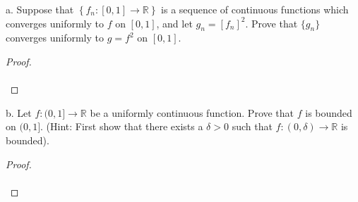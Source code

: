 a.  Suppose that $\left\{f_n:[0,1] \to \mathbb{R}\right\}$ is a sequence of
    continuous functions which converges uniformly to $f$ on $[0, 1]$, and let
    $g_n = [f_n]^2$. Prove that $\{g_n\}$ converges uniformly to 
    $g = f^2$ on $[0, 1]$.\ \\

    \begin{proof}\renewcommand{\qedsymbol}{}\ \\\\
    \end{proof}

    \pagebreak

b.  Let $f:(0, 1] \to \mathbb{R}$ be a uniformly continuous function. Prove that
    $f$ is bounded on $(0, 1]$. (Hint: First show that there exists a
    $\delta > 0$ such that $f:(0, \delta)\to\mathbb{R}$ is bounded). \ \\

    \begin{proof}\renewcommand{\qedsymbol}{}\ \\\\
    \end{proof}

    \pagebreak